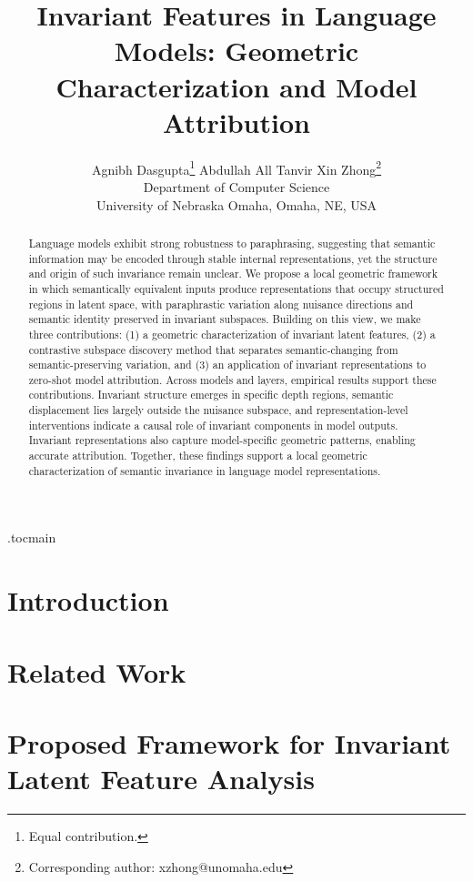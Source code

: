 \documentclass{article}
\title{Invariant Features in Language Models: Geometric Characterization and Model Attribution}
\author{
Agnibh Dasgupta\thanks{Equal contribution.} \quad
Abdullah All Tanvir\footnotemark[1] \quad
Xin Zhong\thanks{Corresponding author: xzhong@unomaha.edu} \\ [0.2em]
Department of Computer Science \\
University of Nebraska Omaha, Omaha, NE, USA \\[0.2em]
}
\begin{document}
\maketitle


\begin{abstract}
Language models exhibit strong robustness to paraphrasing, suggesting that semantic information may be encoded through stable internal representations, yet the structure and origin of such invariance remain unclear. We propose a local geometric framework in which semantically equivalent inputs produce representations that occupy structured regions in latent space, with paraphrastic variation along nuisance directions and semantic identity preserved in invariant subspaces. Building on this view, we make three contributions: (1) a geometric characterization of invariant latent features, (2) a contrastive subspace discovery method that separates semantic-changing from semantic-preserving variation, and (3) an application of invariant representations to zero-shot model attribution. Across models and layers, empirical results support these contributions. Invariant structure emerges in specific depth regions, semantic displacement lies largely outside the nuisance subspace, and representation-level interventions indicate a causal role of invariant components in model outputs. Invariant representations also capture model-specific geometric patterns, enabling accurate attribution. Together, these findings support a local geometric characterization of semantic invariance in language model representations.
\end{abstract}



\etocdepthtag.toc{main}

\section{Introduction}
\label{sec:intro}


\section{Related Work}
\label{sec:related}


\section{Proposed Framework for Invariant Latent Feature Analysis}
\label{sec:method}

\end{document}
